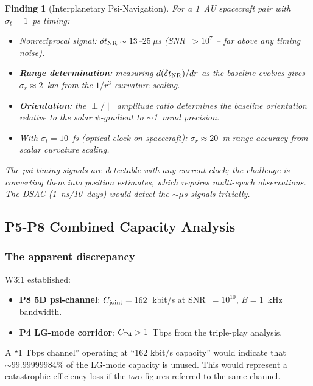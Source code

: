 \documentclass[aps,prd,twocolumn,superscriptaddress,nofootinbib,longbibliography]{revtex4-2}
\newtheorem{finding}{Finding}
\begin{document}
\begin{finding}[Interplanetary Psi-Navigation]
For a 1~AU spacecraft pair with $\sigma_t = 1$~ps timing:
\begin{itemize}
\item Nonreciprocal signal: $\delta t_{\rm NR} \sim 13$--$25\ \mu$s
(SNR~$>10^7$ -- far above any timing noise).
\item \textbf{Range determination}: measuring $d(\delta t_{\rm NR})/dr$
as the baseline evolves gives $\sigma_r\approx 2$~km from the
$1/r^3$ curvature scaling.
\item \textbf{Orientation}: the $\perp/\parallel$ amplitude ratio
determines the baseline orientation relative to the
solar $\psi$-gradient to $\sim$1~mrad precision.
\item With $\sigma_t = 10$~fs (optical clock on spacecraft):
$\sigma_r\approx 20$~m range accuracy from scalar curvature scaling.
\end{itemize}
The psi-timing signals are detectable with any current clock;
the challenge is converting them into position estimates, which
requires multi-epoch observations.  The DSAC (1~ns/10~days)
would detect the $\sim\mu$s signals trivially.
\end{finding}

\subsection{P5-P8 Combined Capacity Analysis}
\label{sec:capacity}

\subsubsection{The apparent discrepancy}

W3i1 established:
\begin{itemize}
\item \textbf{P8 5D psi-channel}: $C_{\rm joint} = 162$~kbit/s
at SNR~$= 10^{10}$, $B = 1$~kHz bandwidth.
\item \textbf{P4 LG-mode corridor}: $C_{\rm P4} > 1$~Tbps from
the triple-play analysis.
\end{itemize}
A ``1 Tbps channel'' operating at ``162 kbit/s capacity'' would
indicate that $\sim 99.99999984\%$ of the LG-mode capacity is unused.
This would represent a catastrophic efficiency loss if the two
figures referred to the same channel.
\end{document}

